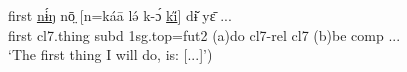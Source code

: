 \documentclass[10pt,twoside]{article}
\newcommand{\gl}[1]{`#1'}
\def\VSP{\vspace{0pt}}
\newcommand{\cl}[1]{{\sc cl#1}}
\begin{document}
\begin{exe}
	\ex \label{exTheFirstThing} 		
		\gll first \uline{nɨ́ŋ} nō̤ [n=káā lə́ k-ɔ́ \uline{ki̋}] dɨ̌ yɛ̄ ...\\
		first	\cl7.thing	{\sc subd} {\sc 1sg.top}={\sc fut2}	({\sc a})do	\cl7-{\sc rel}	\cl7 	({\sc b})be	 {\sc comp}	... \\
		\glt \VSP \gl{The first thing I will do, is: [...]})
\end{exe}%
\end{document}
